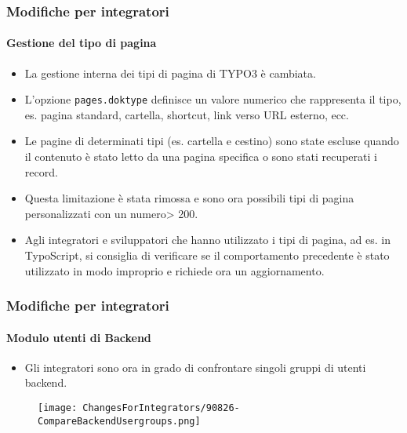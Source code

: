 \begin{frame}[fragile]
	\frametitle{Modifiche per integratori}
	\framesubtitle{Gestione del tipo di pagina}

	\begin{itemize}
		\item La gestione interna dei tipi di pagina di TYPO3 è cambiata.
		\item L'opzione \texttt{pages.doktype} definisce un valore numerico che rappresenta il tipo,
			es. pagina standard, cartella, shortcut, link verso URL esterno, ecc.
		\item Le pagine di determinati tipi (es. cartella e cestino) sono state escluse quando il contenuto
		    è stato letto da una pagina specifica o sono stati recuperati i record.
		\item Questa limitazione è stata rimossa e sono ora possibili tipi di pagina personalizzati con un numero> 200.
		\item Agli integratori e sviluppatori che hanno utilizzato i tipi di pagina, ad es. in TypoScript, si consiglia
		    di verificare se il comportamento precedente è stato utilizzato in modo improprio e richiede ora un aggiornamento.
	\end{itemize}

\end{frame}


\begin{frame}[fragile]
	\frametitle{Modifiche per integratori}
	\framesubtitle{Modulo utenti di Backend}

	\begin{itemize}
		\item Gli integratori sono ora in grado di confrontare singoli gruppi di utenti backend.
	\end{itemize}

	\begin{figure}
		\texttt{[image: ChangesForIntegrators/90826-CompareBackendUsergroups.png]}
	\end{figure}

\end{frame}


